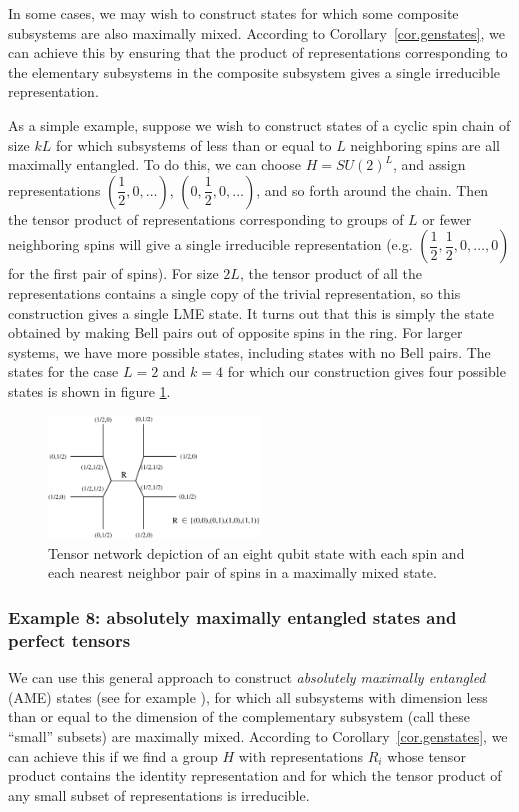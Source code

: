 \documentclass[12pt]{article}
\theoremstyle{definition}
\begin{document}
In some cases, we may wish to construct states for which some composite subsystems are also maximally mixed. According to Corollary~\ref{cor.genstates}, we can achieve this by ensuring that the product of representations corresponding to the elementary subsystems in the composite subsystem gives a single irreducible representation.

As a simple example, suppose we wish to construct states of a cyclic spin chain of size $kL$ for which subsystems of less than or equal to $L$ neighboring spins are all maximally entangled. To do this, we can choose $H = SU(2)^L$, and assign representations $(\dfrac{1}{2}, 0,\dots)$, $(0, \dfrac{1}{2}, 0,\dots)$, and so forth around the chain. Then the tensor product of representations corresponding to groups of $L$ or fewer neighboring spins will give a single irreducible representation (e.g. $(\dfrac{1}{2},\dfrac{1}{2}, 0, \dots, 0)$ for the first pair of spins). For size $2L$, the tensor product of all the representations contains a single copy of the trivial representation, so this construction gives a single LME state. It turns out that this is simply the state obtained by making Bell pairs out of opposite spins in the ring. For larger systems, we have more possible states, including states with no Bell pairs. The states for the case $L=2$ and $k=4$ for which our construction gives four possible states is shown in figure \ref{group2}.

\begin{figure}
\centering
\includegraphics[width=0.5\textwidth]{group2.eps}
\caption{Tensor network depiction of an eight qubit state with each spin and each nearest neighbor pair of spins in a maximally mixed state. }
\label{group2}
\end{figure}



\subsubsection*{Example 8: absolutely maximally entangled states and perfect tensors}

We can use this general approach to construct {\it absolutely
maximally entangled} (AME) states (see for example \cite{Helwig:2012nha}), for which all subsystems with
dimension less than or equal to the dimension of the complementary
subsystem (call these ``small'' subsets) are maximally
mixed. According to Corollary~\ref{cor.genstates}, we can achieve this if we find a
group $H$ with representations $R_i$ whose tensor product contains the
identity representation and for which the tensor product of any small
subset of representations is irreducible. 
\end{document}
